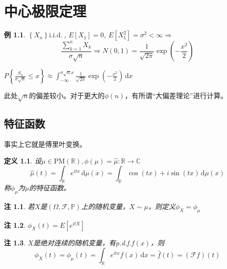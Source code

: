 \documentclass{ctexart}
\begin{document}
\newcommand{\R}{\mathbb{R}}
\newcommand{\N}{\mathbb{N}}
\newcommand{\dd}{\,\mathrm{d}}
\newcommand{\st}{\text{ s.t. }}
\newcommand{\pp}[2]{\frac{\partial #1}{\partial #2}}
\newcommand{\dif}[2]{\frac{\mathrm{d}#1}{\mathrm{d}#2}}
\newcommand{\nm}[1]{\left\|#1\right\|}
\newcommand{\dual}[1]{\left<#1\right>}
\newcommand{\wto}{\rightharpoonup}
\newcommand{\wsto}{\stackrel{*}{\rightharpoonup}}
\newcommand{\cvin}{\text{ in }}
\newcommand{\alev}{\text{ a.e. }}
\newcommand{\alsu}{\text{ a.s. }}
\newcommand{\E}{\mathcal{E}}
\newcommand{\F}{\mathscr{F}}
\newcommand{\G}{\mathscr{G}}
\newcommand{\Bor}{\mathscr{B}}
\newcommand{\pw}{\text{ p.w. }}
\newcommand{\inof}{\text{ i.o. }}
\newcommand{\X}{\bm{X}}
\newcommand{\iid}{\mathrm{i.i.d.}~}
\newcommand{\C}{\mathbb{C}}

\newtheorem{Thm}{定理}[section]
\newtheorem{Lemma}[Thm]{引理}
\newtheorem{Prop}[Thm]{命题}
\newtheorem{Cor}[Thm]{推论}
\newtheorem{Def}{定义}[section]
\newtheorem{Rmk}{注}[section]
\newtheorem{Eg}{例}[section]

\else
\chapter{中心极限定理}
\fi
\begin{Eg}
  $\left\{ X_n \right\}\iid$, $E[X_1]=0$, $E[X_1^2]=\sigma^2<\infty\Rightarrow$
\begin{equation}
\frac{\sum_{k=1}^nX_k}{\sigma \sqrt{n}}\Rightarrow N \left( 0,1 \right)=\frac{1}{\sqrt{2\pi}}\exp(-\frac{x^2}{2})
\end{equation}
\end{Eg}

$P \left\{ \frac{S_n}{\sigma \sqrt{n}}\leq x \right\}\approx \int_{-\infty}^{\sigma \sqrt{n}x}\frac{1}{\sqrt{2\pi}}\exp(-\frac{x^2}{2})\dd x$

此处$\sqrt{n}$的偏差较小。对于更大的$\phi(n)$，有所谓“大偏差理论”进行计算。

\section{特征函数}
事实上它就是傅里叶变换。
\begin{Def}
  设$\mu\in \mathrm{PM}(\mathbb{R}), \phi(\mu)=\hat{\mu}:\mathbb{R}\to \mathbb{C}$ 
\begin{equation}
\hat{\mu}(t)=\int_{\R}e^{itx}\dd\mu(x)=\int_{\R}\cos(tx)+i\sin(tx)\dd\mu(x)
\end{equation}
称$\phi_{\mu}$为$\mu$的特征函数。
\end{Def}
\begin{Rmk}
  若$X$是$\left( \Omega,\mathscr{F},\mathbb{P}\right)$上的随机变量，$X\sim\mu$，则定义$\phi_X=\phi_{\mu}$
\end{Rmk}
\begin{Rmk}
  $\phi_X(t)=E \left[ e^{itX} \right]$
\end{Rmk}
\begin{Rmk}
  $X$是绝对连续的随机变量，有p.d.f.$f(x)$，则
\begin{equation}
\phi_X(t)=\phi_{\mu}(t)=\int_{\R}e^{itx}f(x)\dd x=\hat{f}(t)=(\mathcal{F}f)(t)
\end{equation}
\end{Rmk}
\end{document}
